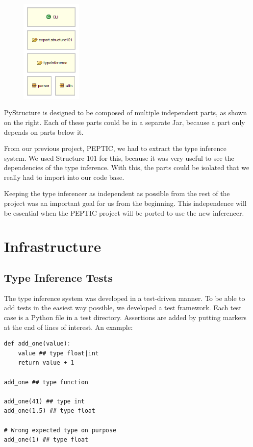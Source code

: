 \documentclass[12pt,halfparskip,DIV11,BCOR10mm]{scrreprt}
\begin{document}
\begin{figure}
    \vspace{-0.7cm}
    \includegraphics[width=3cm]{architecture/parts}
    \vspace{-1.5cm}
\end{figure}

PyStructure is designed to be composed of multiple independent parts, as shown on the right. Each of these parts could be in a separate Jar, because a part only depends on parts below it.

From our previous project, PEPTIC, we had to extract the type inference system. We used Structure 101 for this, because it was very useful to see the dependencies of the type inference. With this, the parts could be isolated that we really had to import into our code base.

Keeping the type inferencer as independent as possible from the rest of the project was an important goal for us from the beginning. This independence will be essential when the PEPTIC project will be ported to use the new inferencer.

\section{Infrastructure}

\subsection{Type Inference Tests}

The type inference system was developed in a test-driven manner. To be able to add tests in the easiest way possible, we developed a test framework. Each test case is a Python file in a test directory. Assertions are added by putting markers at the end of lines of interest. An example:

\begin{lstlisting}
def add_one(value):
    value ## type float|int
    return value + 1

add_one ## type function

add_one(41) ## type int
add_one(1.5) ## type float

# Wrong expected type on purpose
add_one(1) ## type float
\end{lstlisting}
\end{document}
